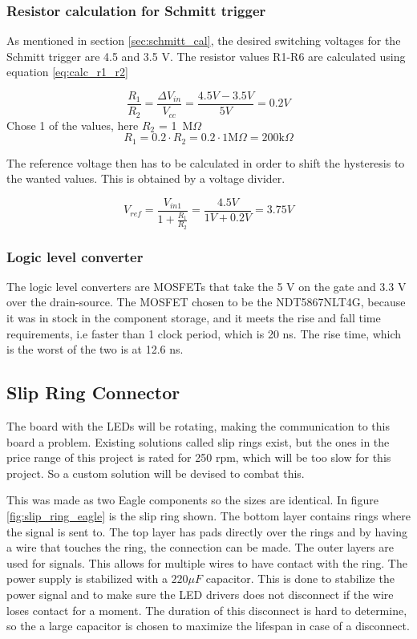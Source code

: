 \subsubsection*{Resistor calculation for Schmitt trigger}
As mentioned in section \ref{sec:schmitt_cal}, the desired switching voltages for the Schmitt trigger are 4.5 and 3.5 V.
The resistor values R1-R6 are calculated using equation \ref{eq:calc_r1_r2}\cite{book:prac_ele}

\begin{equation}\label{eq:calc_r1_r2}
 \frac{R_1}{R_2} = \frac{\Delta V_{in}}{V_{cc}} = \frac{4.5V-3.5V}{5V} = 0.2V
\end{equation}
Chose 1 of the values, here $R_2$ = 1\ M$\Omega$
\begin{equation}
 R_1 = 0.2\cdot R_2 = 0.2\cdot 1 \text{M} \Omega = 200 \text{k}\Omega
\end{equation}

The reference voltage then has to be calculated in order to shift the hysteresis to the wanted values.
This is obtained by a voltage divider.

\begin{equation}
 V_{ref} = \frac{V_{in1}}{1+\frac{R_1}{R_2}} = \frac{4.5V}{1V+0.2V} = 3.75 V
\end{equation}

\subsubsection*{Logic level converter}

The logic level converters are MOSFETs that take the 5 V on the gate and 3.3 V over the drain-source.
The MOSFET chosen to be the NDT5867NLT4G, because it was in stock in the component storage, and it meets the rise and fall time requirements, i.e faster than 1 clock period, which is 20 ns.
The rise time, which is the worst of the two is at 12.6 ns.

\subsection{Slip Ring Connector}\label{sec:ring_connector}
The board with the LEDs will be rotating, making the communication to this board a problem.
Existing solutions called slip rings exist, but the ones in the price range of this project is rated for 250 rpm, which will be too slow for this project.
So a custom solution will be devised to combat this.

This was made as two Eagle components so the sizes are identical.
In figure \ref{fig:slip_ring_eagle} is the slip ring shown.
The bottom layer contains rings where the signal is sent to.
The top layer has pads directly over the rings and by having a wire that touches the ring, the connection can be made.
The outer layers are used for signals.
This allows for multiple wires to have contact with the ring.
The power supply is stabilized with a $220 \mu F$ capacitor.
This is done to stabilize the power signal and to make sure the LED drivers does not disconnect if the wire loses contact for a moment.
The duration of this disconnect is hard to determine, so the a large capacitor is chosen to maximize the lifespan in case of a disconnect.

